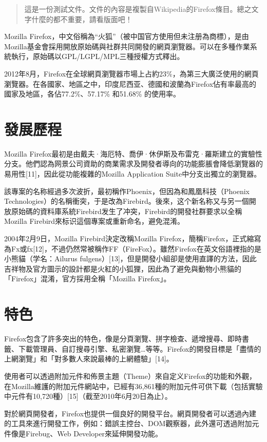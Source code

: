 \documentclass[12pt]{article}
\begin{document}
\begin{abstract}
這是一份測試文件。文件的內容是複製自Wikipedia的Firefox條目。總之文字什麼的都不重要，請看版面吧！
\end{abstract}

Mozilla Firefox，中文俗稱為“火狐”（被中国官方使用但未注册為商標），是由Mozilla基金會採用開放原始碼與社群共同開發的網頁瀏覽器。可以在多種作業系統執行，原始碼以GPL/LGPL/MPL三種授權方式釋出。

2012年8月，Firefox在全球網頁瀏覽器市場上占約23\%，為第三大廣泛使用的網頁瀏覽器。在各國家、地區之中，印度尼西亚、德國和波蘭為Firefox佔有率最高的國家及地區，各佔77.2\%、57.17\% 和51.68\% 的使用率。

\section{發展歷程}
Mozilla Firefox最初是由戴夫·海厄特、喬伊·休伊斯及布雷克·羅斯建立的實驗性分支。他們認為网景公司資助的商業需求及開發者導向的功能膨脹會降低瀏覽器的易用性[11]，因此從功能複雜的Mozilla Application Suite中分支出獨立的瀏覽器。

該專案的名称經過多次波折，最初稱作Phoenix，但因為和鳳凰科技（Phoenix Technologies）的名稱衝突，于是改為Firebird。後來，这个新名称又与另一個開放原始碼的資料庫系統Firebird发生了冲突，Firebird的開發社群要求以全稱Mozilla Firebird來标识這個專案或重新命名，避免混淆。

2004年2月9日，Mozilla Firebird決定改稱Mozilla Firefox，簡稱Firefox，正式縮寫為Fx或fx[12]，不過仍然常被稱作FF（FireFox）。雖然Firefox在英文俗語裡指的是小熊貓（学名：Ailurus fulgens）[13]，但是開發小組卻是使用直譯的方法，因此吉祥物及官方圖示的設計都是火紅的小狐狸，因此為了避免與動物小熊貓的「Firefox」混淆，官方採用全稱「Mozilla Firefox」。

\section{特色}

Firefox包含了許多突出的特色，像是分頁瀏覽、拼字檢查、遞增搜尋、即時書籤、下載管理員、自訂搜尋引擎、私密瀏覽…等等。Firefox的開發目標是「盡情的上網瀏覽」和「對多數人來說最棒的上網體驗」[14]。

使用者可以透過附加元件和佈景主題（Theme）來自定义Firefox的功能和外觀，在Mozilla維護的附加元件網站中，已經有36,861種的附加元件可供下載（包括實驗中元件有10,720種）[15]（截至2010年6月20日為止）。

對於網頁開發者，Firefox也提供一個良好的開發平台。網頁開發者可以透過內建的工具來進行開發工作，例如：錯誤主控台、DOM觀察器，此外還可透過附加元件像是Firebug、Web Developer來延伸開發功能。
\end{document}
